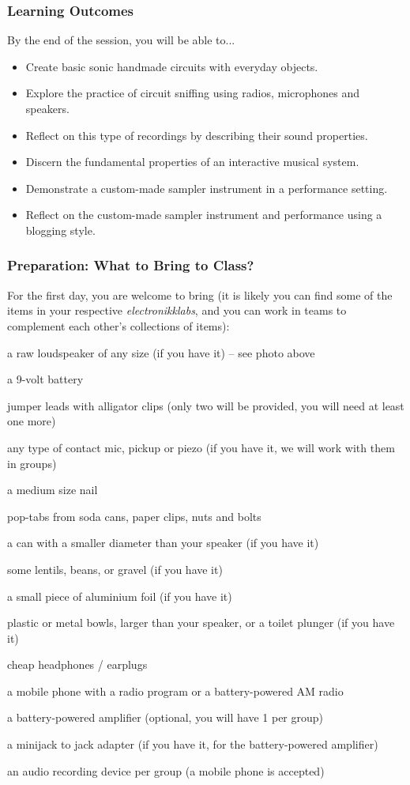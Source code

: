 \documentclass[screen, aspectratio=169]{beamer}
\begin{document}
\begin{frame}
\frametitle{Learning Outcomes}
By the end of the session,  you will be able to...
\begin{itemize}
\item Create basic sonic handmade circuits with everyday objects.
\item Explore the practice of circuit sniffing using radios, microphones and speakers.
\item Reflect on this type of recordings by describing their sound properties.
\item Discern the fundamental properties of an interactive musical system.
\item Demonstrate a custom-made sampler instrument in a performance setting.
\item Reflect on the custom-made sampler instrument and performance using a blogging style.
\end{itemize}
\end{frame}
%
\begin{frame}
  \frametitle{Preparation: What to Bring to Class?}
  For the first day, you are welcome to bring (it is likely you can find some of the items in your respective \emph{electronikklabs}, and you can work in teams to complement each other's collections of items):
        \begin{itemize}
	{\tiny 	
	\item a raw loudspeaker of any size (if you have it) -- see photo above
	\item a 9-volt battery
	\item jumper leads with alligator clips (only two will be provided, you will need at least one more)
	\item any type of contact mic, pickup or piezo (if you have it, we will work with them in groups)
	\item a medium size nail
	\item pop-tabs from soda cans, paper clips, nuts and bolts
	\item a can with a smaller diameter than your speaker (if you have it)
	\item some lentils, beans, or gravel (if you have it)
	\item a small piece of aluminium foil (if you have it)
	\item plastic or metal bowls, larger than your speaker, or a toilet plunger (if you have it)
	\item cheap headphones / earplugs
	\item a mobile phone with a radio program or a battery-powered AM radio
	\item a battery-powered amplifier (optional, you will have 1 per group)
	\item a minijack to jack adapter (if you have it, for the battery-powered amplifier)
	\item an audio recording device per group (a mobile phone is accepted)
	}
         \end{itemize}
\end{frame}
%
\end{document}
